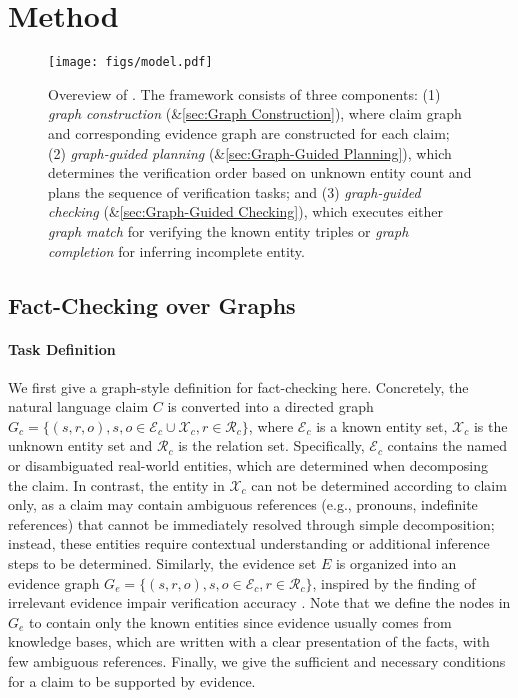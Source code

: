 \section{Method}
\begin{figure*}
    \centering
    \texttt{[image: figs/model.pdf]}
    \caption{Overeview of {\MyFC}. The framework consists of three components: (1) \textit{graph construction} (\&\ref{sec:Graph Construction}), where claim graph and corresponding evidence graph are constructed for each claim; (2) \textit{graph-guided planning} (\&\ref{sec:Graph-Guided Planning}), which determines the verification order based on unknown entity count and plans the sequence of verification tasks; and (3) \textit{graph-guided checking} (\&\ref{sec:Graph-Guided Checking}), which executes either \textit{graph match} for verifying the known entity triples or \textit{graph completion} for inferring incomplete entity.}
    \label{fig:model}
\end{figure*}
\subsection{Fact-Checking over Graphs} \label{preliminaries}
\paragraph{Task Definition} We first give a graph-style definition for fact-checking here. Concretely, the natural language claim $C$ is converted into a directed graph $G_c = \{(s, r, o), s, o \in \mathcal{E}_c \cup \mathcal{X}_c, r \in \mathcal{R}_c\}$, where $\mathcal{E}_c$ is a known entity set, $\mathcal{X}_c$ is the unknown entity set and $\mathcal{R}_c$ is the relation set. Specifically, $\mathcal{E}_c$ contains the named or disambiguated real-world entities, which are determined when decomposing the claim. In contrast, the entity in $\mathcal{X}_c$ can not be determined according to claim only, as a claim may contain ambiguous references (e.g., pronouns, indefinite references) that cannot be immediately resolved through simple decomposition; instead, these entities require contextual understanding or additional inference steps to be determined. Similarly, the evidence set $E$ is organized into an evidence graph $G_e = \{(s, r, o), s, o \in \mathcal{E}_c, r \in \mathcal{R}_c\}$, inspired by the finding of irrelevant evidence impair verification accuracy \cite{guan-etal-2024-language}. Note that we define the nodes in $G_e$ to contain only the known entities since evidence usually comes from knowledge bases, which are written with a clear presentation of the facts, with few ambiguous references. Finally, we give the sufficient and necessary conditions for a claim to be supported by evidence.



